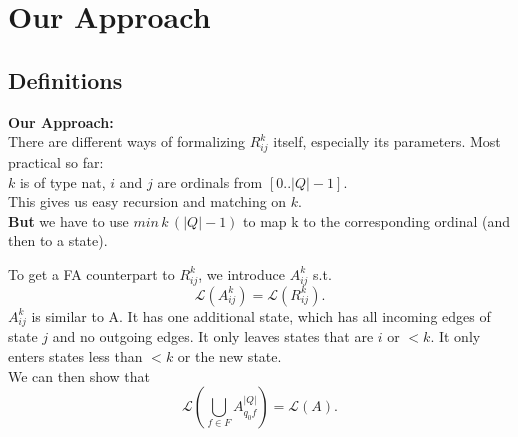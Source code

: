 \documentclass{beamer}
\begin{document}
\section{Our Approach}
\subsection*{Definitions}
\begin{frame}
    \textbf{Our Approach:} \\

    There are different ways of formalizing $R^k_{i j}$ itself, especially its parameters. Most practical so far: \\
    $k$ is of type nat, $i$ and $j$ are ordinals from $[0..|Q|-1]$.\\
    \pause
    This gives us easy recursion and matching on $k$.\\
    \pause
    \textbf{But} we have to use $min \, k \, (|Q|-1)$ to map k to the corresponding ordinal (and then to a state).

\end{frame}

\begin{frame}
    To get a FA counterpart to $R^k_{i j}$, we introduce $A^k_{i j}$ s.t.
    \[
        \mathcal{L}(A^k_{i j}) = \mathcal{L}(R^k_{i j}).
    \]
    $A^k_{i j}$ is similar to A. It has one additional state, which has all incoming edges of state $j$ and no outgoing edges. It only leaves states that are $i$ or  $<k$. It only enters states less than $<k$ or the new state.
    \\
    We can then show that  
    \[
        \mathcal{L}(\bigcup_{f \in F} A^{|Q|}_{q_0 f}) = \mathcal{L}(A).
    \]
\end{frame}
\end{document}
